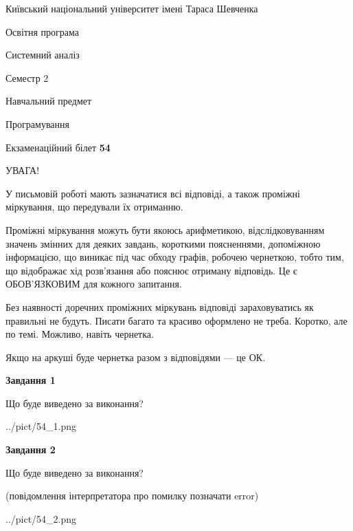 \documentclass[12pt, ukrainian]{article}
\begin{document}
{{\begin {small}\par
{ \center  Київський національний університет імені Тараса Шевченка \par}
{\parbox {5 cm}{Освітня програма \hfill}{\parbox {7 cm}{Системний аналіз \hfill}}\parbox {6 cm}{\hfill Семестр 2}}\par
{\parbox {5 cm} {Навчальний предмет \hfill}\parbox {7 cm}{Програмування \hfill}\parbox {6cm}{\hfill}\par}\vspace{-7pt} \end{small}}{\center Екзаменаційний білет \No \textbf
{ 54 }\par}}
{
\begin {large}
УВАГА!

У письмовій роботі мають зазначатися всі відповіді, а також проміжні міркування, що передували їх отриманню.

Проміжні міркування можуть бути якоюсь арифметикою, відслідковуванням зна\-чень змінних для деяких завдань,
короткими поясненнями, допоміжною інформацією, що виникає під час обходу графів, робочею чернеткою,
тобто тим, що відображає хід розв’язання або пояснює отриману відповідь.
Це є ОБОВ’ЯЗКОВИМ для кожного запитання.

Без наявності доречних проміжних міркувань відповіді зараховуватись як правиль\-ні не будуть.
Писати багато та красиво оформлено не треба. Коротко, але по темі. Можли\-во, навіть чернетка.

Якщо на аркуші буде чернетка разом з відповідями --- це ОК.

\newpage

{\begin {center}\textbf{Завдання 1}\end {center}}\par
Що буде виведено за виконання?\par
\begin{center}
	{../pict/54_1.png}
\end{center}
\newpage

{\begin {center}\textbf{Завдання 2}\end {center}}\par
Що буде виведено за виконання?\par
 (повідомлення інтерпретатора про помилку позначати error)\par
\begin{center}
	{../pict/54_2.png}
\end{center}
\newpage


\end{large}}
\end{document}

